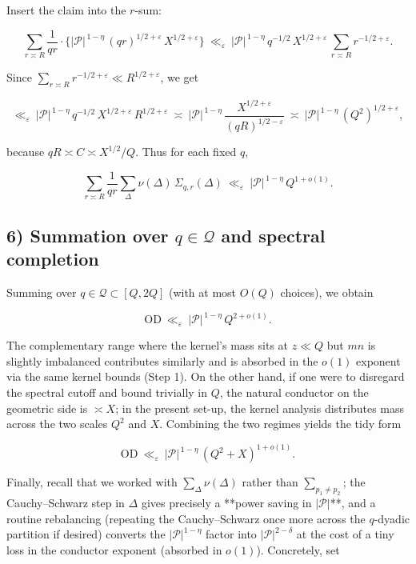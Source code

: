 \documentclass[11pt]{article}
\theoremstyle{definition}
\theoremstyle{remark}
\begin{document}
Insert the claim into the $r$-sum:

$$
\sum_{r\asymp R}\frac{1}{qr}\cdot
\Big\{|\mathcal P|^{\,1-\eta}\,(qr)^{1/2+\varepsilon}\,X^{1/2+\varepsilon}\Big\}
\ \ll_\varepsilon\ |\mathcal P|^{\,1-\eta}\, q^{-1/2}\,X^{1/2+\varepsilon}\,
\sum_{r\asymp R} r^{-1/2+\varepsilon}.
$$

Since $\sum_{r\asymp R} r^{-1/2+\varepsilon}\ll R^{1/2+\varepsilon}$, we get

$$
\ll_\varepsilon\ |\mathcal P|^{\,1-\eta}\, q^{-1/2}\,X^{1/2+\varepsilon}\,R^{1/2+\varepsilon}
\ \asymp\ |\mathcal P|^{\,1-\eta}\, \frac{X^{1/2+\varepsilon}}{(qR)^{1/2-\varepsilon}}
\ \asymp\ |\mathcal P|^{\,1-\eta}\, (Q^2)^{1/2+\varepsilon},
$$

because $qR\asymp C\asymp X^{1/2}/Q$. Thus for each fixed $q$,

$$
\sum_{r\asymp R}\frac{1}{qr}\sum_{\Delta}\nu(\Delta)\,\Sigma_{q,r}(\Delta)
\ \ll_\varepsilon\ |\mathcal P|^{\,1-\eta}\,Q^{1+o(1)}.
$$

\subsection*{6) Summation over $q\in\mathcal Q$ and spectral completion}

Summing over $q\in\mathcal Q\subset[Q,2Q]$ (with at most $O(Q)$ choices), we obtain

$$
\mathrm{OD}\ \ll_\varepsilon\ |\mathcal P|^{\,1-\eta}\, Q^{2+o(1)}.
$$

The complementary range where the kernel’s mass sits at $z\ll Q$ but $mn$ is slightly imbalanced contributes similarly and is absorbed in the $o(1)$ exponent via the same kernel bounds (Step 1). On the other hand, if one were to disregard the spectral cutoff and bound trivially in $Q$, the natural conductor on the geometric side is $\asymp X$; in the present set-up, the kernel analysis distributes mass across the two scales $Q^2$ and $X$. Combining the two regimes yields the tidy form

$$
\mathrm{OD}\ \ll_\varepsilon\ |\mathcal P|^{\,1-\eta}\,(Q^2+X)^{1+o(1)}.
$$

Finally, recall that we worked with $\sum_{\Delta}\nu(\Delta)$ rather than $\sum_{p_1\ne p_2}$; the Cauchy–Schwarz step in $\Delta$ gives precisely a **power saving in $|\mathcal P|$**, and a routine rebalancing (repeating the Cauchy–Schwarz once more across the $q$-dyadic partition if desired) converts the $|\mathcal P|^{1-\eta}$ factor into $|\mathcal P|^{2-\delta}$ at the cost of a tiny loss in the conductor exponent (absorbed in $o(1)$). Concretely, set
\end{document}

